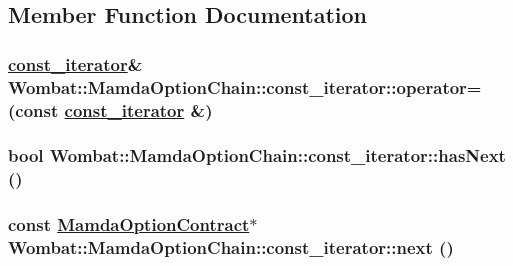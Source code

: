 \subsection{Member Function Documentation}
\hypertarget{classWombat_1_1MamdaOptionChain_1_1const__iterator_436bb182281c55b30c57ddb2766e2b78}{
\subsubsection[operator=]{\setlength{\rightskip}{0pt plus 5cm}\hyperlink{classWombat_1_1MamdaOptionChain_1_1const__iterator}{const\_\-iterator}\& Wombat::Mamda\-Option\-Chain::const\_\-iterator::operator= (const \hyperlink{classWombat_1_1MamdaOptionChain_1_1const__iterator}{const\_\-iterator} \&)}}
\label{classWombat_1_1MamdaOptionChain_1_1const__iterator_436bb182281c55b30c57ddb2766e2b78}


\hypertarget{classWombat_1_1MamdaOptionChain_1_1const__iterator_bbd8e3de3f6831bbb2cb0d134a58a603}{
\subsubsection[hasNext]{\setlength{\rightskip}{0pt plus 5cm}bool Wombat::Mamda\-Option\-Chain::const\_\-iterator::has\-Next ()}}
\label{classWombat_1_1MamdaOptionChain_1_1const__iterator_bbd8e3de3f6831bbb2cb0d134a58a603}


\hypertarget{classWombat_1_1MamdaOptionChain_1_1const__iterator_02f105b3a879e872fc5542923abe6f7a}{
\subsubsection[next]{\setlength{\rightskip}{0pt plus 5cm}const \hyperlink{classWombat_1_1MamdaOptionContract}{Mamda\-Option\-Contract}$\ast$ Wombat::Mamda\-Option\-Chain::const\_\-iterator::next ()}}
\label{classWombat_1_1MamdaOptionChain_1_1const__iterator_02f105b3a879e872fc5542923abe6f7a}




